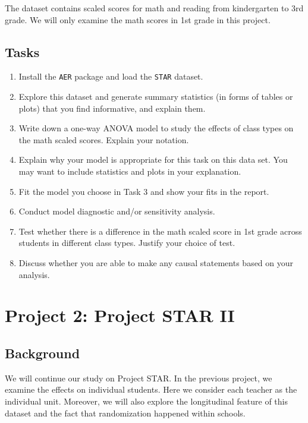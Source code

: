 \documentclass[12pt,]{book}
\providecommand{\tightlist}{%
  \setlength{\itemsep}{0pt}\setlength{\parskip}{0pt}}
\begin{document}
The dataset contains scaled scores for math and reading from
kindergarten to 3rd grade. We will only examine the math scores in 1st
grade in this project.

\subsection{Tasks}\label{tasks}

\begin{enumerate}
\def\labelenumi{\arabic{enumi}.}
\tightlist
\item
  Install the \texttt{AER} package and load the \texttt{STAR} dataset.\\
\item
  Explore this dataset and generate summary statistics (in forms of
  tables or plots) that you find informative, and explain them.\\
\item
  Write down a one-way ANOVA model to study the effects of class types
  on the math scaled scores. Explain your notation.
\item
  Explain why your model is appropriate for this task on this data set.
  You may want to include statistics and plots in your explanation.
\item
  Fit the model you choose in Task 3 and show your fits in the report.
\item
  Conduct model diagnostic and/or sensitivity analysis.
\item
  Test whether there is a difference in the math scaled score in 1st
  grade across students in different class types. Justify your choice of
  test.
\item
  Discuss whether you are able to make any causal statements based on
  your analysis.
\end{enumerate}

\section{Project 2: Project STAR II}\label{project-2-project-star-ii}

\subsection{Background}\label{background-1}

We will continue our study on Project STAR. In the previous project, we
examine the effects on individual students. Here we consider each
teacher as the individual unit. Moreover, we will also explore the
longitudinal feature of this dataset and the fact that randomization
happened within schools.
\end{document}

